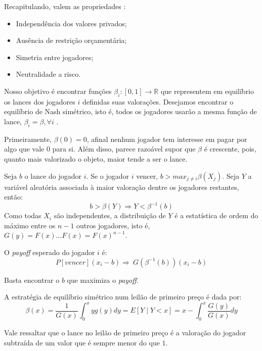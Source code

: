 Recapitulando, valem as propriedades \citet{krishna}:
\begin{itemize}
	\item Independência dos valores privados;
	\item Ausência de restrição orçamentária;
	\item Simetria entre jogadores;
	\item Neutralidade a risco.
\end{itemize}

Nosso objetivo é encontrar funções $\beta_i : [0, 1] \xrightarrow{} \mathbb{R}$ que representem em equilíbrio os lances dos jogadores $i$ definidas suas valorações. Desejamos encontrar o equilíbrio de Nash simétrico, isto é, todos os jogadores usarão a mesma função de lance, $\beta_i = \beta, \forall i$ \citet{krishna}.

Primeiramente, $\beta(0) = 0$, afinal nenhum jogador tem interesse em pagar por algo que vale 0 para si. Além disso, parece razoável supor que $\beta$ é crescente, pois, quanto mais valorizado o objeto, maior tende a ser o lance.

Seja $b$ o lance do jogador $i$. Se o jogador $i$ vencer, $b > max_{j \ne i} \beta(X_j)$. Seja $Y$ a variável aleatória associada à maior valoração dentre os jogadores restantes, então:
\begin{equation}
b > \beta(Y) \Rightarrow Y < \beta^{-1}(b)    
\end{equation}
Como todas $X_i$ são independentes, a distribuição de $Y$ é a estatística de ordem do máximo entre os $n-1$ outros jogadores, isto é, $G(y) = F(x) \ldots F(x) = F(x)^{n-1}$.

O \emph{payoff} esperado do jogador $i$ é:
\begin{equation}
    P[vencer] (x_i - b) \Rightarrow \
    G(\beta^{-1}(b)) (x_i - b)
\end{equation}

Basta encontrar o $b$ que maximiza o \emph{payoff}.

\begin{lema}
    A estratégia de equilíbrio simétrico num leilão de primeiro preço é dada por:
    \begin{equation}
        \beta(x) = \frac{1}{G(x)} \int_{0}^{x} yg(y)dy = E\left[ Y \mid Y<x \right] = x - \int_{0}^{x} \frac{G(y)}{G(x)}dy
    \end{equation}
\end{lema}

Vale ressaltar que o lance no leilão de primeiro preço é a valoração do jogador subtraída de um valor que é sempre menor do que $1$.

